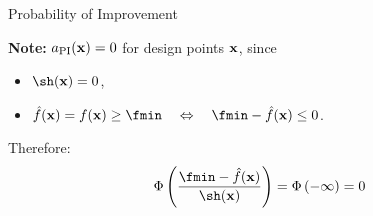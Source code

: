 \documentclass[11pt,compress,t,notes=noshow, xcolor=table]{beamer}
\begin{document}
\begin{frame}{Probability of Improvement}

 {
\vspace{1em}
\textbf{Note:} $a_\text{PI}(\mathbf{x})=0$ for design points $\mathbf{x}$, since
\begin{itemize}
    \item $\sh(\xv) = 0$,
    \item $\fh(\xv) = f(\xv) \ge \fmin \quad \Leftrightarrow \quad \fmin - \fh(\xv) \le 0$.
\end{itemize}
Therefore:
$$
  \Phi\left(\frac{\fmin - \fh(\xv)}{\sh(\xv)}\right) = \Phi\left(- \infty\right) = 0
$$

}

\end{frame}
\end{document}
